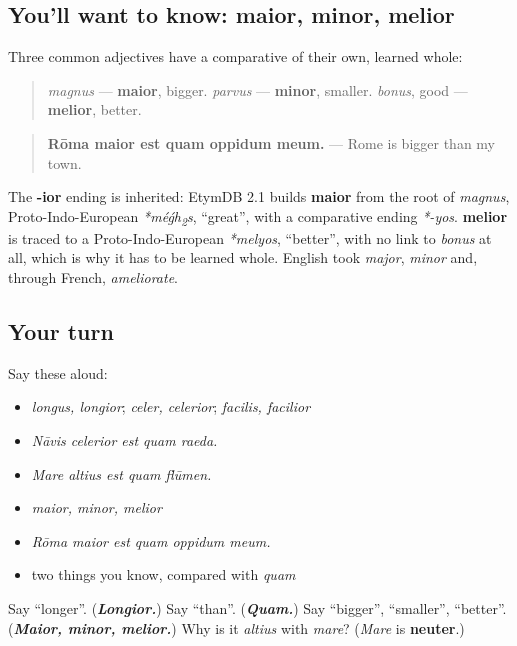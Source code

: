 \subsection*{You'll want to know: maior, minor, melior}
Three common adjectives have a comparative of their own, learned whole:

\begin{quote}
\emph{magnus} — \textbf{maior}, bigger. \emph{parvus} — \textbf{minor}, smaller. \emph{bonus}, good — \textbf{melior}, better.
\end{quote}

\begin{quote}
\textbf{Rōma maior est quam oppidum meum.} — Rome is bigger than my town.
\end{quote}

\begin{cousinweb}
The \textbf{-ior} ending is inherited: EtymDB 2.1 builds \textbf{maior} from the root of \emph{magnus}, Proto-Indo-European \emph{*méǵh\textsubscript{2}s}, \textquotedblleft{}great\textquotedblright{}, with a comparative ending \emph{*-yos}. \textbf{melior} is traced to a Proto-Indo-European \emph{*melyos}, \textquotedblleft{}better\textquotedblright{}, with no link to \emph{bonus} at all, which is why it has to be learned whole. English took \emph{major}, \emph{minor} and, through French, \emph{ameliorate}.
\end{cousinweb}

\subsection*{Your turn}
Say these aloud:

\begin{itemize}
\raggedright
  \item \emph{longus, longior}; \emph{celer, celerior}; \emph{facilis, facilior}
  \item \emph{Nāvis celerior est quam raeda.}
  \item \emph{Mare altius est quam flūmen.}
  \item \emph{maior, minor, melior}
  \item \emph{Rōma maior est quam oppidum meum.}
  \item two things you know, compared with \emph{quam}
\end{itemize}

\begin{tcolorbox}[breakable,colback=teal!4,colframe=teal!35!black,title={Before you move on}]
Say \textquotedblleft{}longer\textquotedblright{}. (\emph{\textbf{Longior.}}) Say \textquotedblleft{}than\textquotedblright{}. (\emph{\textbf{Quam.}}) Say \textquotedblleft{}bigger\textquotedblright{}, \textquotedblleft{}smaller\textquotedblright{}, \textquotedblleft{}better\textquotedblright{}. (\emph{\textbf{Maior, minor, melior.}}) Why is it \emph{altius} with \emph{mare}? (\emph{Mare} is \textbf{neuter}.)
\end{tcolorbox}
